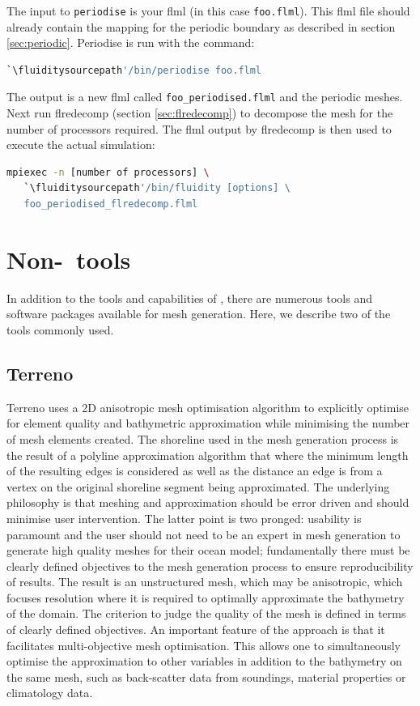 The input to \lstinline+periodise+ is your flml (in this case
\lstinline{foo.flml}). This flml file should already contain the mapping for
the periodic boundary as described in section
\ref{sec:periodic}. Periodise is run with the command:

\begin{lstlisting}[language=bash]
`\fluiditysourcepath'/bin/periodise foo.flml
\end{lstlisting}

The output is a new flml called \lstinline+foo_periodised.flml+ and the
periodic meshes. Next run flredecomp (section \ref{sec:flredecomp}) to decompose the mesh for the number of processors
required. The flml output by flredecomp is then used to execute the actual simulation:

\begin{lstlisting}[language=bash]
mpiexec -n [number of processors] \
   `\fluiditysourcepath'/bin/fluidity [options] \
   foo_periodised_flredecomp.flml
\end{lstlisting}

\section{Non-\fluidity\ tools}

In addition to the tools and capabilities of \fluidity, there are numerous
tools and software packages available for mesh generation. Here, we describe 
two of the tools commonly used.

\subsection{Terreno}

Terreno uses a 2D anisotropic mesh optimisation algorithm to explicitly optimise for 
element quality and bathymetric approximation while minimising the number of mesh
elements created. The shoreline used in the mesh generation process is the result 
of a polyline approximation algorithm that where the minimum length of the resulting 
edges is considered as well as the distance an edge is from a vertex on the original 
shoreline segment being approximated. The underlying philosophy is that meshing and 
approximation should be error driven and should minimise user intervention. The 
latter point is two pronged: usability is paramount and the user should not need 
to be an expert in mesh generation to generate high quality meshes for their ocean 
model; fundamentally there must be clearly defined objectives to the mesh generation 
process to ensure reproducibility of results. The result is an unstructured mesh, 
which may be anisotropic, which focuses resolution where it is required to optimally 
approximate the bathymetry of the domain. The criterion to judge the quality of the 
mesh is defined in terms of clearly defined objectives. An important feature of the 
approach is that it facilitates multi-objective mesh optimisation. This allows one to 
simultaneously optimise the approximation to other variables in addition to the 
bathymetry on the same mesh, such as back-scatter data from soundings, material 
properties or climatology data. 

